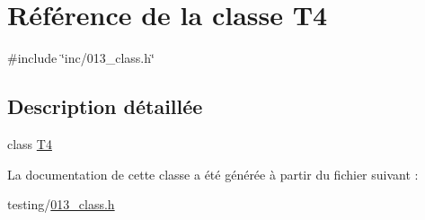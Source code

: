 \hypertarget{class_t4}{}\section{Référence de la classe T4}
\label{class_t4}


{\ttfamily \#include \char`\"{}inc/013\+\_\+class.\+h\char`\"{}}



\subsection{Description détaillée}
class \hyperlink{class_t4}{T4} 

La documentation de cette classe a été générée à partir du fichier suivant \+:\begin{DoxyCompactItemize}
\item 
testing/\hyperlink{013__class_8h}{013\+\_\+class.\+h}\end{DoxyCompactItemize}
